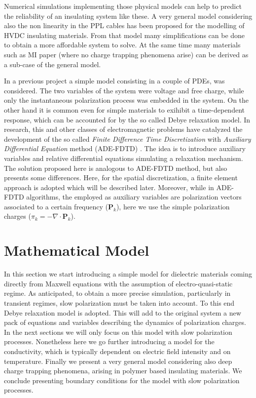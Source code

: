 \documentclass[11pt,a4paper]{article}
\begin{document}
Numerical simulations implementing those physical models can help to predict the reliability of an insulating system like these. A very general model considering also the non linearity in the PPL cables has been proposed for the modelling of HVDC insulating materials. From that model many simplifications can be done to obtain a more affordable system to solve. At the same time many materials such as MI paper (where no charge trapping phenomena arise) can be derived as a sub-case of the general model.

In a previous project a simple model consisting in a couple of PDEs, was considered. The two variables of the system were voltage and free charge, while only the instantaneous polarization process was embedded in the system. On the other hand it is common even for simple materials to exihibit a time-dependent response, which can be accounted for by the so called Debye relaxation model. In research, this and other classes of electromagnetic problems have catalyzed the development of the so called \textit{Finite Difference Time Discretization} with \textit{Auxiliary Differential Equation} method (ADE-FDTD) \cite{ADE-FDTD}. The idea is to introduce auxiliary variables and relative differential equations simulating a relaxation mechanism. The solution proposed here is analogous to ADE-FDTD method, but also presents some differences. Here, for the spatial discretization, a finite element approach is adopted which will be described later. Moreover, while in ADE-FDTD algorithms, the employed as auxiliary variables are polarization vectors associated to a certain frequency (\(\mathbf{P}_k\)), here we use the simple polarization charges (\(\pi_k=-\nabla \cdot\mathbf{P}_k\)). \cite{hakonseththesis}




\section{Mathematical Model}
In this section we start introducing a simple model for dielectric materials coming directly from Maxwell equations with the assumption of electro-quasi-static regime. As anticipated, to obtain a more precise simulation, particularly in transient regimes, slow polarization must be taken into account. To this end Debye relaxation model is adopted. This will add to the original system a new pack of equations and variables describing the dynamics of polarization charges. In the next sections we will only focus on this model with slow polarization processes. Nonetheless  here we go further introducing a model for the conductivity, which is typically dependent on electric field intensity and on temperature. Finally we present a very general model considering also deep charge trapping phenomena, arising in polymer based insulating materials. We conclude presenting boundary conditions for the model with slow polarization processes.
\end{document}
